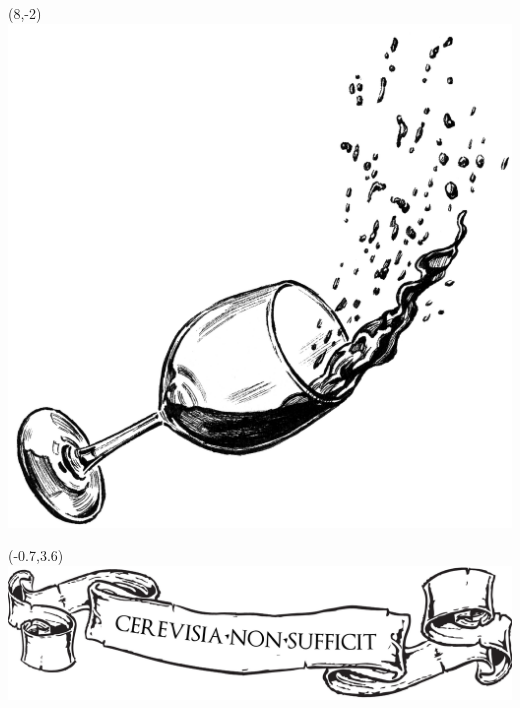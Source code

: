 \documentclass{article}
\begin{document}
\begin{textblock}{1}(8,-2)
\includegraphics{wine.png}
\end{textblock}
\begin{textblock}{1}(-0.7,3.6)
\includegraphics[scale=1]{logo.png}
\end{textblock}
\end{document}
